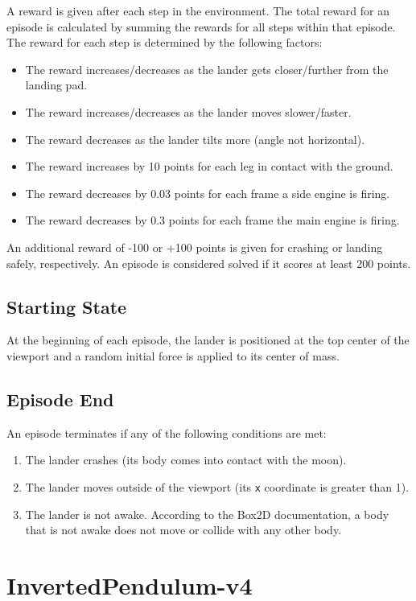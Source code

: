 \documentclass{article} %
\begin{document}
A reward is given after each step in the environment. The total reward for an episode is calculated by summing the rewards for all steps within that episode. The reward for each step is determined by the following factors: \begin{itemize} \item The reward increases/decreases as the lander gets closer/further from the landing pad. \item The reward increases/decreases as the lander moves slower/faster. \item The reward decreases as the lander tilts more (angle not horizontal). \item The reward increases by 10 points for each leg in contact with the ground. \item The reward decreases by 0.03 points for each frame a side engine is firing. \item The reward decreases by 0.3 points for each frame the main engine is firing. \end{itemize} An additional reward of -100 or +100 points is given for crashing or landing safely, respectively. An episode is considered solved if it scores at least 200 points.

\subsection{Starting State}
At the beginning of each episode, the lander is positioned at the top center of the viewport and a random initial force is applied to its center of mass.


\subsection{Episode End}
An episode terminates if any of the following conditions are met: \begin{enumerate} \item The lander crashes (its body comes into contact with the moon). \item The lander moves outside of the viewport (its \verb|x| coordinate is greater than 1). \item The lander is not awake. According to the Box2D documentation, a body that is not awake does not move or collide with any other body. \end{enumerate}

\section{InvertedPendulum-v4}
\end{document}
